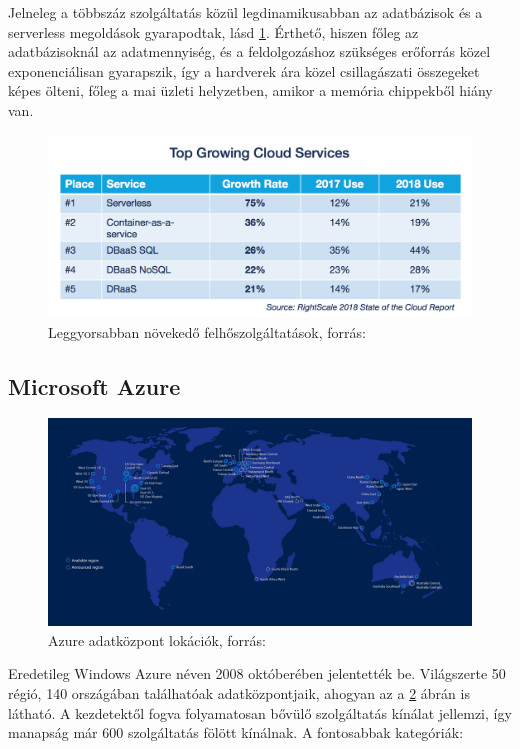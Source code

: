\documentclass[12pt,oneside,justify,table]{book}
\begin{document}
Jelneleg a többszáz szolgáltatás közül legdinamikusabban az adatbázisok és a serverless megoldások gyarapodtak, lásd \ref{fig:TopGrowingCloudServices}. Érthető, hiszen főleg az adatbázisoknál az adatmennyiség, és a feldolgozáshoz szükséges erőforrás közel exponenciálisan gyarapszik, így a hardverek ára közel csillagászati összegeket képes ölteni, főleg a mai üzleti helyzetben, amikor a memória chippekből hiány van. \\
\begin{figure}[H]
\centering
\includegraphics[width=1\textwidth]{6-Cloud-Computing-Trends-Serverless-Top-Growing-Cloud-Service.png}
\caption{Leggyorsabban növekedő felhőszolgáltatások, forrás: \cite{RightScale}}
\label{fig:TopGrowingCloudServices}
\end{figure}

\subsection{Microsoft Azure}
\begin{figure}[H]
\centering
\includegraphics[width=1\textwidth]{azure_locations.jpg}
\caption{Azure adatközpont lokációk, forrás: \cite{Azure_Regions}}
\label{fig:AzureRegions}
\end{figure}
Eredetileg Windows Azure néven 2008 októberében jelentették be. Világszerte 50 régió, 140 országában találhatóak adatközpontjaik, ahogyan az a \ref{fig:AzureRegions} ábrán is látható. A kezdetektől fogva folyamatosan bővülő szolgáltatás kínálat jellemzi, így manapság már 600 szolgáltatás fölött kínálnak. A fontosabbak kategóriák: \cite{Azure_Services}\\
\end{document}
